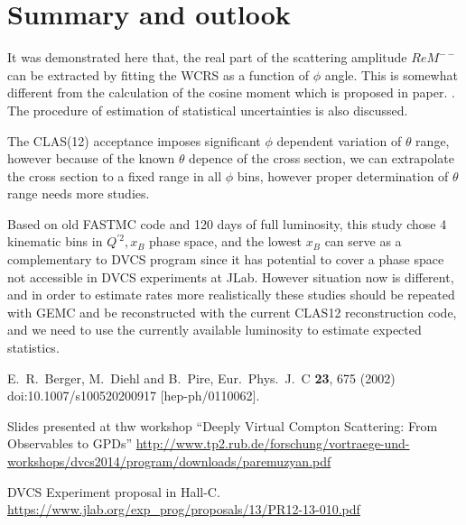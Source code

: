 \documentclass[letterpaper,12pt]{article}
\begin{document}
 \section{Summary and outlook}
 It was demonstrated here that, the real part of the scattering amplitude $ReM^{--}$ can be extracted by fitting the WCRS as a function of $\phi$ angle. This is somewhat different from the calculation of the cosine moment which is proposed in paper. \cite{Berger:2001xd}. The procedure of estimation of statistical uncertainties is also discussed.
 
 The CLAS(12) acceptance imposes significant $\phi$ dependent variation of $\theta$ range, however because of the known $\theta$ depence of the cross section,  we can extrapolate the cross section to a fixed range in all $\phi$ bins, however proper determination of $\theta$ range needs more studies.
 
 Based on old FASTMC code and 120 days of full luminosity, this study chose 4 kinematic bins
 in $Q^{\prime 2}, x_{B}$ phase space, and the lowest $x_{B}$ can serve as a complementary to DVCS program since it has potential to cover a phase space not accessible in DVCS experiments at JLab. However situation now is different, and in order to estimate rates more realistically these studies should be repeated with GEMC and be reconstructed with the current CLAS12 reconstruction code, and we need to use the currently available luminosity to estimate expected statistics.

 
 
 \begin{thebibliography}{100}
  E.~R.~Berger, M.~Diehl and B.~Pire,
  Eur.\ Phys.\ J.\ C {\bf 23}, 675 (2002)
  doi:10.1007/s100520200917
  [hep-ph/0110062].
  
 Slides presented at thw workshop ``Deeply Virtual Compton Scattering: From Observables to GPDs'' 
 \href{http://www.tp2.rub.de/forschung/vortraege-und-workshops/dvcs2014/program/downloads/paremuzyan.pdf}{http://www.tp2.rub.de/forschung/vortraege-und-workshops/dvcs2014/program/downloads/paremuzyan.pdf}
 
 DVCS Experiment proposal in Hall-C.
 \href{https://www.jlab.org/exp\_prog/proposals/13/PR12-13-010.pdf}{https://www.jlab.org/exp\_prog/proposals/13/PR12-13-010.pdf}
 

 \end{thebibliography}
\end{document}
